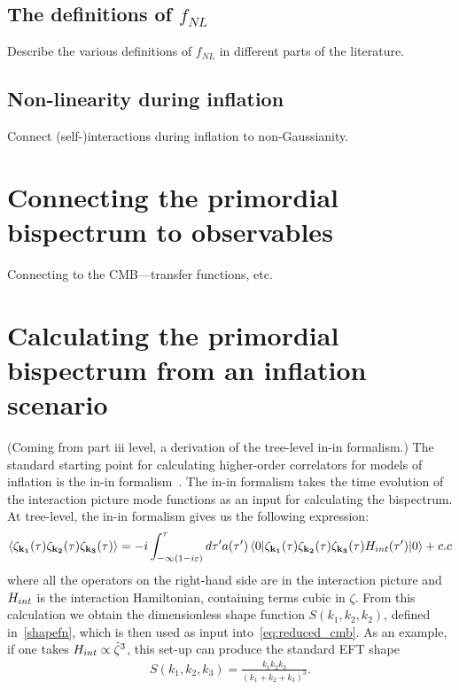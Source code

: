     \newpage
    \subsection{The definitions of $f_{NL}$}
    Describe the various definitions of $f_{NL}$ in different
    parts of the literature.
    \newpage
    \subsection{Non-linearity during inflation}
    Connect (self-)interactions during inflation to non-Gaussianity.
    \newpage
\section{Connecting the primordial bispectrum to observables}
    Connecting to the CMB---transfer functions, etc.
\newpage
    \section{Calculating the primordial bispectrum from an inflation scenario}
    (Coming from part iii level, a derivation of the tree-level in-in formalism.)
    The standard starting point for calculating
higher-order correlators for models of inflation is the in-in formalism~\cite{Maldacena,weinberg_in_in}.
The in-in formalism takes the time evolution of the interaction picture mode
functions as an input for calculating the bispectrum.
At tree-level, the in-in formalism gives us the
following expression:
\begin{align}
{
    \left< \zeta_{\mathbf{k_1}}(\tau)\zeta_{\mathbf{k_2}}(\tau)\zeta_{\mathbf{k_3}}(\tau) \right>
=-i\int_{-\infty(1-i\varepsilon)}^{\tau}d\tau'a(\tau')
    \left<0\lvert \zeta_{\mathbf{k_1}}(\tau)\zeta_{\mathbf{k_2}}(\tau)\zeta_{\mathbf{k_3}}(\tau)H_{int}(\tau') \rvert0\right>+c.c\label{in-in}
}
\end{align}
where all the operators on the right-hand side are in the interaction picture
and $H_{int}$ is the interaction Hamiltonian, containing terms cubic in $\zeta$.
From this calculation we obtain the dimensionless shape function $S(k_1,k_2,k_2)$,
defined in~\eqref{shapefn},
which is then used as input into~\eqref{eq:reduced_cmb}.
As an example, if one takes $H_{int}\propto\dot{\zeta}^3$, this set-up can produce the standard EFT shape
\begin{align}\label{example_eft2}
    S(k_1, k_2, k_3) = \frac{k_1k_2k_3}{(k_1+k_2+k_3)^3}.
\end{align}

